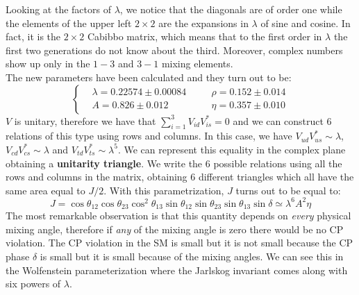 \documentclass[../main.tex]{subfiles}
\begin{document}
Looking at the factors of $\lambda$, we notice that the diagonals are of order one while the elements of the upper left $2\times2$ are the expansions in $\lambda$ of sine and cosine. In fact, it is the $2\times2$ Cabibbo matrix, which means that to the first order in $\lambda$ the first two generations do not know about the third. Moreover, complex numbers show up only in the $1-3$ and $3-1$ mixing elements.\\
The new parameters have been calculated and they turn out to be:
\[
\left\{
\begin{aligned}
&\lambda=0.22574\pm0.00084 \quad &&\rho=0.152\pm0.014\\
&A=0.826\pm0.012 \quad &&\eta=0.357\pm0.010
\end{aligned}
\right.
\]
$V$ is unitary, therefore we have that $\sum_{i=1}^3V_{id}V_{is}^*=0$ and we can construct 6 relations of this type using rows and columns. In this case, we have $V_{ud}V_{us}^*\sim\lambda$, $V_{cd}V_{cs}^*\sim\lambda$ and $V_{td}V_{ts}^*\sim\lambda^5$. We can represent this equality in the complex plane obtaining a \textbf{unitarity triangle}.
We write the 6 possible relations using all the rows and columns in the matrix, obtaining 6 different triangles which all have the same area equal to $J/2$. With this parametrization, $J$ turns out to be equal to:
\[
J=\cos\theta_{12}\cos\theta_{23}\cos^2\theta_{13}\sin\theta_{12}\sin\theta_{23}\sin\theta_{13}\sin\delta\simeq\lambda^6A^2\eta
\]
The most remarkable observation is that this quantity depends on \textit{every} physical mixing angle, therefore if \textit{any} of the mixing angle is zero there would be no CP violation. The CP violation in the SM is small but it is not small because the CP phase $\delta$ is small but it is small because of the mixing angles. We can see this in the Wolfenstein parameterization where the Jarlskog invariant comes along with six powers of $\lambda$.\\
\end{document}

